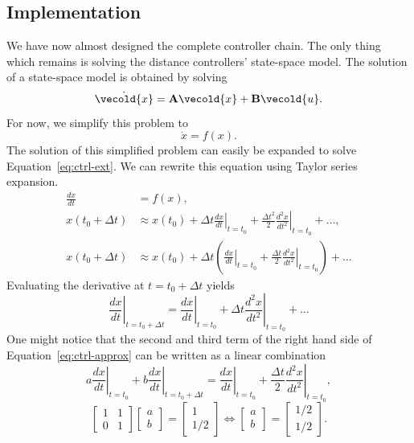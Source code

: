 \documentclass[11pt,titlepage]{report}
\let\vec\vecold
\newcommand{\vec}[1]{\mathbf{#1}}
\begin{document}
\subsection{Implementation}
We have now almost designed the complete controller chain. The only thing which remains is solving the distance controllers' state-space model. The solution of a state-space model is obtained by solving
\begin{equation} \label{eq:ctrl-ext}
	\dot{\vec{x}}=\mat{A}\vec{x}+\mat{B}\vec{u}.
\end{equation}
For now, we simplify this problem to
\begin{equation*}
	\dot{x}=f(x).
\end{equation*}
The solution of this simplified problem can easily be expanded to solve Equation~\ref{eq:ctrl-ext}. We can rewrite this equation using Taylor series expansion.
\begin{align}
\frac{dx}{dt} &= f(x), \nonumber \\
x(t_0+\Delta t) &\approx
x(t_0)+
\left. \Delta t \frac{dx}{dt} \right|_{t=t_0}+
\frac{\Delta t^2}{2}\left. \frac{d^2x}{dt^2} \right|_{t=t_0}+
\dots, \nonumber \\
x(t_0+\Delta t) &\approx
x(t_0)+
\Delta t \left(
\left. \frac{dx}{dt} \right|_{t=t_0}+
\frac{\Delta t}{2}\left. \frac{d^2x}{dt^2} \right|_{t=t_0}
\right) + \dots \label{eq:ctrl-approx}
\end{align}
Evaluating the derivative at $t=t_0+\Delta t$ yields
\begin{equation*}
\left. \frac{dx}{dt} \right|_{t=t_0+\Delta t} =
\left. \frac{dx}{dt} \right|_{t=t_0} +
\Delta t \left. \frac{d^2x}{dt^2} \right|_{t=t_0} + \dots
\end{equation*}
One might notice that the second and third term of the right hand side of Equation~\ref{eq:ctrl-approx} can be written as a linear combination
\begin{equation*}
a \left. \frac{dx}{dt} \right|_{t=t_0} +
b \left. \frac{dx}{dt} \right|_{t=t_0+\Delta t} =
\left. \frac{dx}{dt} \right|_{t=t_0}+
\frac{\Delta t}{2}\left. \frac{d^2x}{dt^2} \right|_{t=t_0},
\end{equation*}
\begin{equation*}
\begin{bmatrix}
1 & 1 \\
0 & 1
\end{bmatrix} \begin{bmatrix}
a \\
b
\end{bmatrix} = \begin{bmatrix}
1 \\
1/2
\end{bmatrix} \Leftrightarrow \begin{bmatrix}
a \\
b
\end{bmatrix} = \begin{bmatrix}
1/2 \\
1/2
\end{bmatrix}.
\end{equation*}
\end{document}
